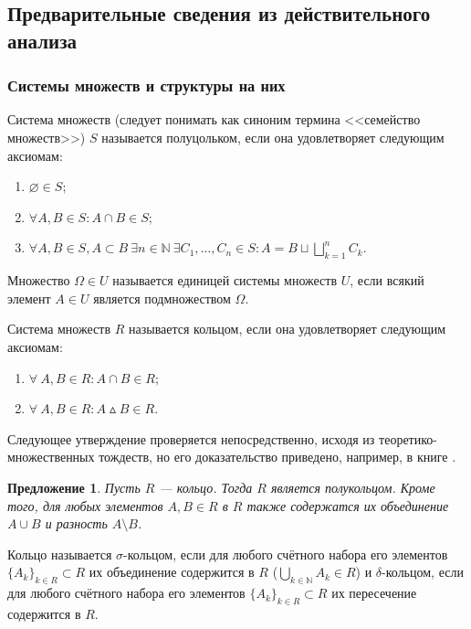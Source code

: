 \documentclass[12pt]{article}
\newtheorem{proposition}[theorem]{Предложение}
\numberwithin{theorem}{section}
\theoremstyle{definition}
\newcommand{\defin}[2]{\hypertarget{#2}{{\color{red} #1}}}
\begin{document}
	\subsection{Предварительные сведения из действительного анализа}
	
	\subsubsection{Системы множеств и структуры на них}
	
	Система множеств (следует понимать как синоним термина <<семейство множеств>>) $ S $ 
	называется \defin{полуцольком}{semiring}, если она удовлетворяет следующим аксиомам:
	\begin{enumerate}
		\item $ \varnothing \in S $;
		\item $ \forall A, B \in S: A \cap B \in S $;
		\item $ \forall A, B \in S, A \subset B \ \exists n \in \mathbb{N} \ \exists C_1, \ldots, C_n \in S: 
		A = B \sqcup \bigsqcup\limits_{k = 1}^{n} C_k  $.
	\end{enumerate}
	
	Множество $ \Omega \in U $ называется \defin{единицей системы множеств $ U $}{unit},
	если всякий элемент $ A \in U $ является подмножеством $ \Omega $.
	
	Система множеств $ R $ называется \defin{кольцом}{ring}, если она удовлетворяет следующим аксиомам:
	\begin{enumerate}
		\item $ \forall \ A, B \in R: A \cap B \in R $;
		\item $ \forall \ A, B \in R: A \vartriangle B \in R $.
	\end{enumerate}
	
	Следующее утверждение проверяется непосредственно, исходя из теоретико-множественных тождеств,
	но его доказательство приведено, например, в книге \cite{DiyachenoUliyanov}.
	
	\begin{proposition}
		Пусть $ R $ --- кольцо. Тогда $ R $ является полукольцом.
		Кроме того, для любых элементов $ A, B \in R $ в $ R $ также содержатся их объединение $ A \cup B $
		и разность $ A \setminus B $. 
	\end{proposition}
	
	Кольцо называется \defin{$ \sigma $-кольцом}{sigma-ring}, если 
	для любого счётного набора его элементов $ \{A_k\}_{k \in R} \subset R $ их объединение содержится в $ R $
	($ \bigcup\limits_{k \in \mathbb{N}} A_k \in R $)
	и \defin{$ \delta $-кольцом}{delta-ring},
	если для любого счётного набора его элементов $ \{A_k\}_{k \in R} \subset R $ их пересечение содержится в $ R $.
	
\end{document}
